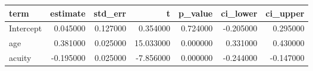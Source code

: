 \begin{tabular}{lrrrrrr}
\toprule
term & estimate & std_err & t & p_value & ci_lower & ci_upper \\
\midrule
Intercept & 0.045000 & 0.127000 & 0.354000 & 0.724000 & -0.205000 & 0.295000 \\
age & 0.381000 & 0.025000 & 15.033000 & 0.000000 & 0.331000 & 0.430000 \\
acuity & -0.195000 & 0.025000 & -7.856000 & 0.000000 & -0.244000 & -0.147000 \\
\bottomrule
\end{tabular}
